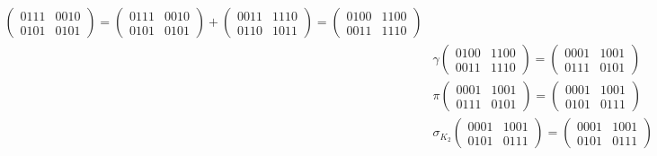 \documentclass[fleqn]{article}
\begin{document}
\begin{equation*}
\begin{aligned}
\begin{pmatrix}
                0111 & 0010 \\
                0101 & 0101
            \end{pmatrix} =
            \begin{pmatrix}
                0111 & 0010 \\
                0101 & 0101
            \end{pmatrix} +
            \begin{pmatrix}
                0011 & 1110 \\
                0110 & 1011
            \end{pmatrix} =
            \begin{pmatrix}
                0100 & 1100 \\
                0011 & 1110
            \end{pmatrix} \\
            &\gamma \begin{pmatrix}
                0100 & 1100 \\
                0011 & 1110
            \end{pmatrix} =
            \begin{pmatrix}
                0001 & 1001 \\
                0111 & 0101
            \end{pmatrix} \\
            &\pi \begin{pmatrix}
                0001 & 1001 \\
                0111 & 0101
            \end{pmatrix} =
            \begin{pmatrix}
                0001 & 1001 \\
                0101 & 0111
            \end{pmatrix} \\
            &\sigma_{K_2} \begin{pmatrix}
                0001 & 1001 \\
                0101 & 0111
            \end{pmatrix} =
            \begin{pmatrix}
                0001 & 1001 \\
                0101 & 0111
            \end{pmatrix} +
            \begin{pmatrix}
                0111 & 1111 \\
                0001 & 0100
            \end{pmatrix} =
            \begin{pmatrix}
                0110 & 0110 \\
                0100 & 0011
            \end{pmatrix} \\
        \end{aligned}
    \end{equation*}
\end{document}

